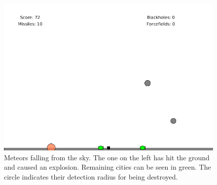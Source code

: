 \documentclass{article}
\begin{document}
\begin{figure}[H]
\centering
\includegraphics[width=1\textwidth, keepaspectratio]{imgs/Meteors.png}
\caption{Meteors falling from the sky. The one on the left has hit the ground and caused an explosion. Remaining cities can be seen in green. The circle indicates their detection radius for being destroyed.}
\end{figure}
\end{document}
